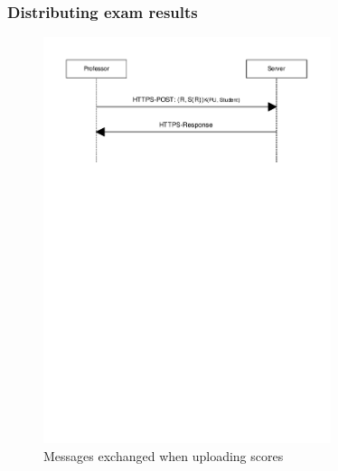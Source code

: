 \documentclass{article}
\begin{document}
\subsubsection{Distributing exam results}

\begin{figure}
\begin{center}
\includegraphics[width=0.75\textwidth]{images/upload_scores.pdf}
\caption{Messages exchanged when uploading scores}
\label{fig:upload-scores}
\end{center}
\end{figure}
\end{document}
